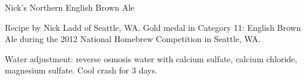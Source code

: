 \begin{recipe}{Nick's Northern English Brown Ale} %

\begin{aboutblock}
Recipe by Nick Ladd of Seattle, WA. Gold medal in Category 11: English Brown Ale
during the 2012 National Homebrew Competition in Seattle, WA. \sourceaha
\end{aboutblock}


\begin{methodandtiming}

\begin{mashsteps}
\end{mashsteps}

\begin{fermentationsteps}
\end{fermentationsteps}

\begin{directions}
Water adjustment: reverse osmosis water with  calcium sulfate,
 calcium chloride,  magnesium sulfate. Cool crash for 3 days. 
\end{directions}

\end{methodandtiming}

\recipebreak

\begin{ingredientsblock}

\begin{malts}
\end{malts}

\begin{hops}
\end{hops}


\end{ingredientsblock}

\end{recipe}

